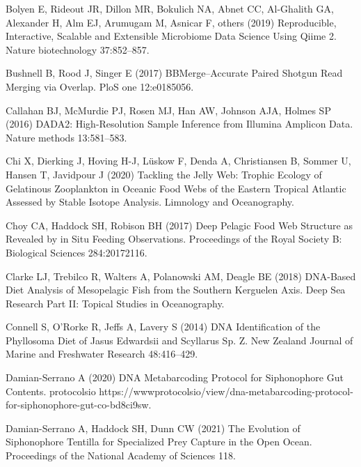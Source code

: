 \documentclass[12pt,]{article}
\begin{document}
\leavevmode\hypertarget{ref-bolyen2019reproducible}{}%
Bolyen E, Rideout JR, Dillon MR, Bokulich NA, Abnet CC, Al-Ghalith GA, Alexander H, Alm EJ, Arumugam M, Asnicar F, others (2019) Reproducible, Interactive, Scalable and Extensible Microbiome Data Science Using Qiime 2. Nature biotechnology 37:852--857.

\leavevmode\hypertarget{ref-bushnell2017bbmerge}{}%
Bushnell B, Rood J, Singer E (2017) BBMerge--Accurate Paired Shotgun Read Merging via Overlap. PloS one 12:e0185056.

\leavevmode\hypertarget{ref-callahan2016dada2}{}%
Callahan BJ, McMurdie PJ, Rosen MJ, Han AW, Johnson AJA, Holmes SP (2016) DADA2: High-Resolution Sample Inference from Illumina Amplicon Data. Nature methods 13:581--583.

\leavevmode\hypertarget{ref-chi2020tackling}{}%
Chi X, Dierking J, Hoving H-J, Lüskow F, Denda A, Christiansen B, Sommer U, Hansen T, Javidpour J (2020) Tackling the Jelly Web: Trophic Ecology of Gelatinous Zooplankton in Oceanic Food Webs of the Eastern Tropical Atlantic Assessed by Stable Isotope Analysis. Limnology and Oceanography.

\leavevmode\hypertarget{ref-choy2017deep}{}%
Choy CA, Haddock SH, Robison BH (2017) Deep Pelagic Food Web Structure as Revealed by in Situ Feeding Observations. Proceedings of the Royal Society B: Biological Sciences 284:20172116.

\leavevmode\hypertarget{ref-clarke2018dna}{}%
Clarke LJ, Trebilco R, Walters A, Polanowski AM, Deagle BE (2018) DNA-Based Diet Analysis of Mesopelagic Fish from the Southern Kerguelen Axis. Deep Sea Research Part II: Topical Studies in Oceanography.

\leavevmode\hypertarget{ref-connell2014dna}{}%
Connell S, O'Rorke R, Jeffs A, Lavery S (2014) DNA Identification of the Phyllosoma Diet of Jasus Edwardsii and Scyllarus Sp. Z. New Zealand Journal of Marine and Freshwater Research 48:416--429.

\leavevmode\hypertarget{ref-damianserrano2020dna}{}%
Damian-Serrano A (2020) DNA Metabarcoding Protocol for Siphonophore Gut Contents. protocolsio https://wwwprotocolsio/view/dna-metabarcoding-protocol-for-siphonophore-gut-co-bd8ci9sw.

\leavevmode\hypertarget{ref-damian2021evolution}{}%
Damian-Serrano A, Haddock SH, Dunn CW (2021) The Evolution of Siphonophore Tentilla for Specialized Prey Capture in the Open Ocean. Proceedings of the National Academy of Sciences 118.
\end{document}

